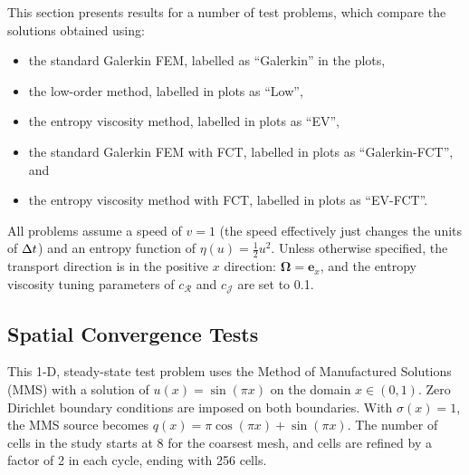 
This section presents results for a number of test problems, which compare
the solutions obtained using:
\begin{itemize}
  \item the standard Galerkin FEM, labelled as ``Galerkin'' in the plots,
  \item the low-order method, labelled in plots as ``Low'',
  \item the entropy viscosity method, labelled in plots as ``EV'',
  \item the standard Galerkin FEM with FCT, labelled in plots as ``Galerkin-FCT'', and
  \item the entropy viscosity method with FCT, labelled in plots as ``EV-FCT''.
\end{itemize}
All problems assume a speed of $v=1$ (the speed effectively just changes the
units of $\Delta t$) and an entropy function of $\eta(u)=\frac{1}{2}u^2$. Unless
otherwise specified, the transport direction is in the positive
$x$ direction: $\mathbf{\Omega}=\mathbf{e}_x$, and the entropy
viscosity tuning parameters of $c_\mathcal{R}$ and $c_\mathcal{J}$ are set
to 0.1.

\subsection{Spatial Convergence Tests}
This 1-D, steady-state test problem uses the Method of Manufactured Solutions (MMS) with
a solution of $u(x)=\sin(\pi x)$ on the domain $x\in(0,1)$. Zero Dirichlet
boundary conditions are imposed on both boundaries.
With $\sigma(x)=1$,
the MMS source becomes $q(x)=\pi\cos(\pi x) + \sin(\pi x)$.
The number of cells in the study starts at 8 for the coarsest mesh, and cells
are refined by a factor of 2 in each cycle, ending with 256 cells.

